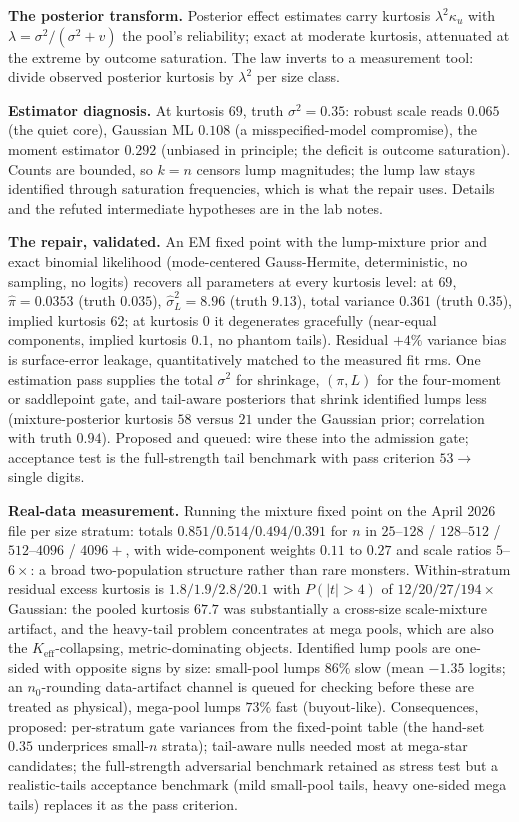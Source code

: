 \documentclass[11pt]{article}
\begin{document}
\textbf{The posterior transform.} Posterior effect estimates carry
kurtosis $\lambda^2 \kappa_u$ with $\lambda = \sigma^2/(\sigma^2 + v)$
the pool's reliability; exact at moderate kurtosis, attenuated at the
extreme by outcome saturation. The law inverts to a measurement tool:
divide observed posterior kurtosis by $\lambda^2$ per size class.

\textbf{Estimator diagnosis.} At kurtosis
$69$, truth $\sigma^2 = 0.35$: robust scale reads $0.065$ (the quiet
core), Gaussian ML $0.108$ (a misspecified-model compromise), the
moment estimator $0.292$ (unbiased in principle; the deficit is outcome
saturation). Counts are bounded, so $k = n$ censors lump magnitudes;
the lump law stays identified through saturation frequencies, which is
what the repair uses. Details and the refuted intermediate hypotheses
are in the lab notes.

\textbf{The repair, validated.} An EM fixed point with the lump-mixture
prior and exact binomial likelihood (mode-centered Gauss-Hermite,
deterministic, no sampling, no logits) recovers all parameters at every
kurtosis level: at $69$, $\hat\pi = 0.0353$ (truth $0.035$),
$\hat\sigma_L^2 = 8.96$ (truth $9.13$), total variance $0.361$ (truth
$0.35$), implied kurtosis $62$; at kurtosis $0$ it degenerates
gracefully (near-equal components, implied kurtosis $0.1$, no phantom
tails). Residual $+4\%$ variance bias is surface-error leakage,
quantitatively matched to the measured fit rms. One estimation pass
supplies the total $\sigma^2$ for shrinkage, $(\pi, L)$ for the
four-moment or saddlepoint gate, and tail-aware posteriors that shrink
identified lumps less (mixture-posterior kurtosis $58$ versus $21$
under the Gaussian prior; correlation with truth $0.94$). Proposed and
queued: wire these into the admission gate; acceptance test is the
full-strength tail benchmark with pass criterion $53 \to$ single
digits.


\textbf{Real-data measurement.} Running the
mixture fixed point on the April 2026 file per size stratum: totals
$0.851 / 0.514 / 0.494 / 0.391$ for $n$ in $25$--$128$ / $128$--$512$ /
$512$--$4096$ / $4096{+}$, with wide-component weights $0.11$ to $0.27$
and scale ratios $5$--$6\times$: a broad two-population structure
rather than rare monsters. Within-stratum residual excess kurtosis is
$1.8 / 1.9 / 2.8 / 20.1$ with $P(|t|>4)$ of $12/20/27/194\times$
Gaussian: the pooled kurtosis $67.7$ was substantially a cross-size
scale-mixture artifact, and the heavy-tail problem concentrates at mega
pools, which are also the $K_{\mathrm{eff}}$-collapsing,
metric-dominating objects. Identified lump pools are one-sided with
opposite signs by size: small-pool lumps $86\%$ slow (mean $-1.35$
logits; an $n_0$-rounding data-artifact channel is queued for checking
before these are treated as physical), mega-pool lumps $73\%$ fast
(buyout-like). Consequences, proposed: per-stratum gate variances from
the fixed-point table (the hand-set $0.35$ underprices small-$n$
strata); tail-aware nulls needed most at mega-star candidates; the
full-strength adversarial benchmark retained as stress test but a
realistic-tails acceptance benchmark (mild small-pool tails, heavy
one-sided mega tails) replaces it as the pass criterion.
\end{document}

